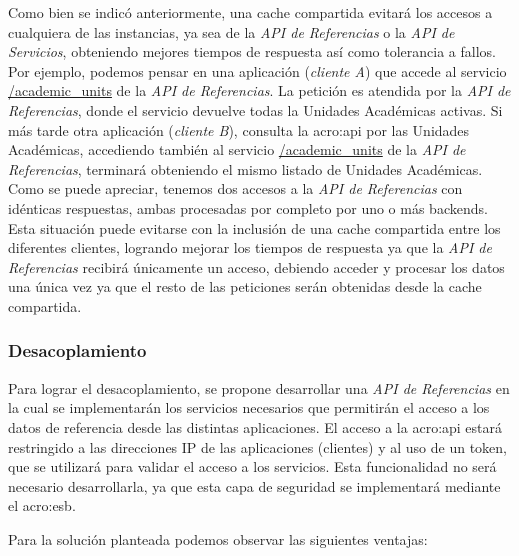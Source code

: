 Como bien se indicó anteriormente, una cache compartida evitará los accesos a cualquiera de las instancias, ya sea de la \textit{API de Referencias} o la \textit{API de Servicios}, obteniendo mejores tiempos de respuesta así como tolerancia a fallos. Por ejemplo, podemos pensar en una aplicación (\textit{cliente A}) que accede al servicio \url{/academic_units} de la \textit{API de Referencias}. La petición es atendida por la \textit{API de Referencias}, donde el servicio devuelve todas la Unidades Académicas activas. Si más tarde otra aplicación (\textit{cliente B}), consulta la \gls{acro:api} por las Unidades Académicas, accediendo también al servicio \url{/academic_units} de la \textit{API de Referencias}, terminará obteniendo el mismo listado de Unidades Académicas. Como se puede apreciar, tenemos dos accesos a la \textit{API de Referencias} con idénticas respuestas, ambas procesadas por completo por uno o más backends. Esta situación puede evitarse con la inclusión de una cache compartida entre los diferentes clientes, logrando mejorar los tiempos de respuesta ya que la \textit{API de Referencias} recibirá únicamente un acceso, debiendo acceder y procesar los datos una única vez ya que el resto de las peticiones serán obtenidas desde la cache compartida.


\subsubsection{Desacoplamiento}

Para lograr el desacoplamiento, se propone desarrollar una \textit{API de Referencias} en la cual se implementarán los servicios necesarios que permitirán el acceso a los datos de referencia desde las distintas aplicaciones. El acceso a la \gls{acro:api} estará restringido a las direcciones IP de las aplicaciones (clientes) y al uso de un token, que se utilizará para validar el acceso a los servicios. Esta funcionalidad no será necesario desarrollarla, ya que esta capa de seguridad se implementará mediante el \gls{acro:esb}.

Para la solución planteada podemos observar las siguientes ventajas:

